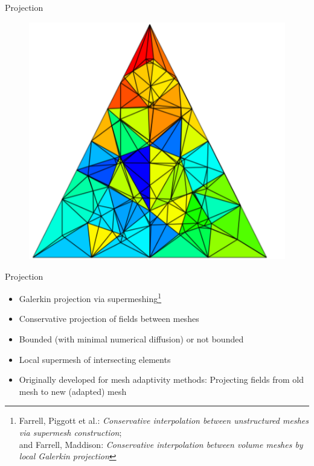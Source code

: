\documentclass[	%
	bigger, %
	hyperref, %
	xcolor,	%
	t,		%
]{beamer}
\begin{document}
\begin{frame}{Projection}
{\begin{figure}[ht!]
  \includegraphics[scale=0.25]{content/projection/images/supermesh-supermesh-for-target-mesh-farrell}
 \end{figure}
}

\end{frame}
\begin{frame}{Projection}
 \begin{itemize}
  \item Galerkin projection via supermeshing\footnote{\scriptsize Farrell, Piggott et al.: \textsl{Conservative interpolation between unstructured meshes via supermesh construction};\\and Farrell, Maddison: \textsl{Conservative interpolation between volume meshes by local Galerkin projection}}
  \item Conservative projection of fields between meshes
  \item Bounded (with minimal numerical diffusion) or not bounded
  \pause
  \item Local supermesh of intersecting elements
  \pause
  \item Originally developed for mesh adaptivity methods: Projecting fields from old mesh to new (adapted) mesh
 \end{itemize}
\end{frame}
\end{document}
